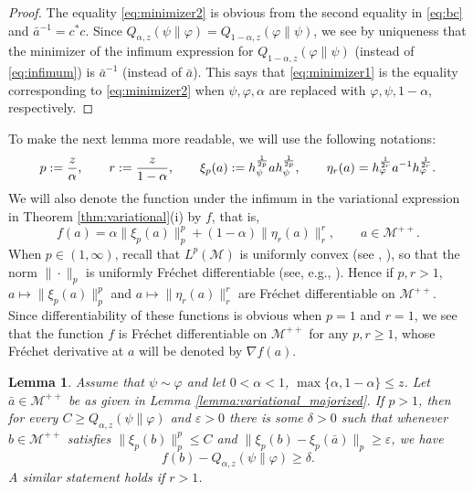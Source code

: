 \documentclass[12pt]{article}
\newtheorem{lemma}[theorem]{Lemma}
\theoremstyle{definition}
\theoremstyle{remark}
\numberwithin{equation}{section}
\def\Me{\mathcal M}
\def\ffi{\varphi}
\def\eps{\varepsilon}
\begin{document}
\begin{proof}
The equality  \eqref{eq:minimizer2} is obvious from the second equality in \eqref{eq:bc} and
$\bar a^{-1}=c^*c$. Since $Q_{\alpha,z}(\psi\|\ffi)=Q_{1-\alpha,z}(\ffi\|\psi)$, we see by uniqueness that
the minimizer of the infimum expression for $Q_{1-\alpha,z}(\ffi\|\psi)$ (instead of \eqref{eq:infimum}) is
$\bar a^{-1}$ (instead of $\bar a$). This says that \eqref{eq:minimizer1} is the equality corresponding to
\eqref{eq:minimizer2} when $\psi,\ffi,\alpha$ are replaced with $\ffi,\psi,1-\alpha$, respectively. 
\end{proof}

To make the next lemma more readable, we will use the following notations:
\[
p:={z\over\alpha},\qquad r:={z\over 1-\alpha},\qquad
\xi_p(a):=h_\psi^{1\over2p}ah_\psi^{1\over 2p},\qquad
\eta_r(a)=h_\ffi^{1\over2r}a^{-1}h_\ffi^{1\over 2r}.
\]
We will also denote the function under the infimum in the variational expression in
Theorem \ref{thm:variational}(i) by $f$, that is,
\begin{equation}\label{func-variational}
f(a)=\alpha\|\xi_p(a)\|_p^p
+(1-\alpha)\|\eta_r(a)\|_r^r,\qquad a\in \Me^{++}.
\end{equation}
When $p\in(1,\infty)$, recall that $L^p(\Me)$ is uniformly convex (see
\cite{haagerup1979lpspaces}, \cite[Theorem 4.2]{kosaki1984applications}), so that the norm
$\|\cdot\|_p$ is uniformly Fr\'echet differentiable (see, e.g.,
\cite[Part 3, Chap.~II]{beauzamy1982introduction}). Hence if $p,r>1$, $a\mapsto\|\xi_p(a)\|_p^p$
and $a\mapsto\|\eta_r(a)\|_r^r$ are Fr\'echet differentiable on $\Me^{++}$. Since differentiability of
these functions is obvious when $p=1$ and $r=1$, we see that the function $f$ is Fr\'echet differentiable
on $\Me^{++}$ for any $p,r\ge1$, whose Fr\'echet derivative at $a$ will be denoted by $\nabla f(a)$.

\begin{lemma}\label{lemma:variational_majorized2}
Assume that $\psi\sim\ffi$  and let $0<\alpha<1$, $\max\{\alpha,1-\alpha\}\le z$. {Let
$\bar a\in\Me^{++}$ be as given in Lemma \ref{lemma:variational_majorized}.} If $p>1$, then for
every $C\ge Q_{\alpha,z}(\psi\|\ffi)$ and $\eps>0$ there is some $\delta>0$ such that whenever
{$b\in\Me^{++}$ satisfies}
$\|\xi_p(b)\|^p_p\le C$ and $\|\xi_p(b)-\xi_p(\bar a)\|_p\ge \eps$, we have
\[
f(b)-Q_{\alpha,z}(\psi\|\ffi)\ge \delta.
\]
A similar statement holds if $r>1$.
\end{lemma}
\end{document}
